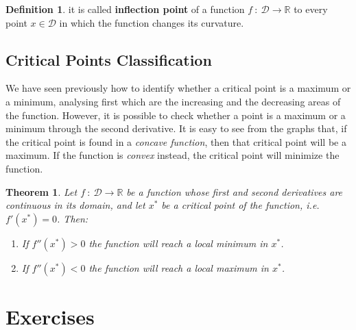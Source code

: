 \documentclass[11pt]{article}
\providecommand{\tightlist}{%
      \setlength{\itemsep}{0pt}\setlength{\parskip}{0pt}}
\theoremstyle{definition}
\newtheorem{definition}{Definition}
\theoremstyle{plain}
\newtheorem{theorem}{Theorem}
\begin{document}
\begin{definition}
it is called \textbf{inflection point} of a
function \(f \: : \: \mathcal{D}\rightarrow\mathbb{R}\) to every point
\(x\in\mathcal{D}\) in which the function changes its curvature.
\end{definition}

\subsection{Critical Points
Classification}\label{critical-points-classification}

We have seen previously how to identify whether a critical point is a
maximum or a minimum, analysing first which are the increasing and the
decreasing areas of the function. However, it is possible to check
whether a point is a maximum or a minimum through the second derivative.
It is easy to see from the graphs that, if the critical point is found
in a \emph{concave function}, then that critical point will be a
maximum. If the function is \emph{convex} instead, the critical point
will minimize the function.

\begin{theorem}
Let \(f \: : \: \mathcal{D}\rightarrow\mathbb{R}\) be
a function whose first and second derivatives are continuous in its
domain, and let \(x^*\) be a critical point of the function, i.e.
\(f'\left(x^*\right) = 0\). Then:

\begin{enumerate}
\def\labelenumi{\arabic{enumi}.}
\tightlist
\item
  If \(f''\left(x^*\right) > 0\) the function will reach a local minimum
  in \(x^*\).
\item
  If \(f''\left(x^*\right) < 0\) the function will reach a local maximum
  in \(x^*\).
\end{enumerate}
\end{theorem}

\section{Exercises}\label{exercises}
\end{document}
